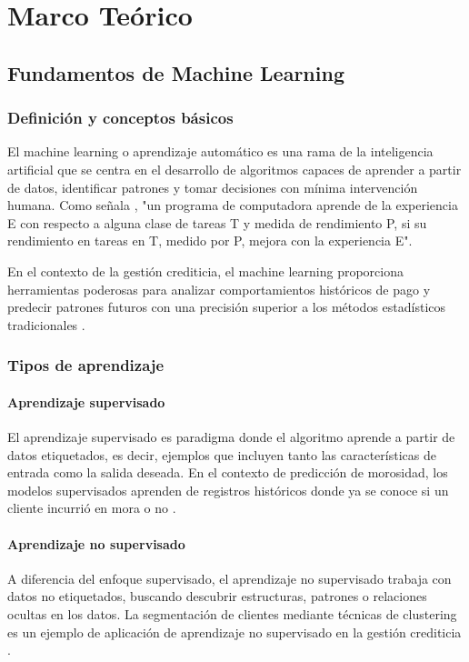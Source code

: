 \chapter{Marco Teórico}

\section{Fundamentos de Machine Learning}
\subsection{Definición y conceptos básicos}
El machine learning o aprendizaje automático es una rama de la inteligencia artificial que se centra en el desarrollo de algoritmos capaces de aprender a partir de datos, identificar patrones y tomar decisiones con mínima intervención humana. Como señala \cite{mitchell1997machine}, "un programa de computadora aprende de la experiencia E con respecto a alguna clase de tareas T y medida de rendimiento P, si su rendimiento en tareas en T, medido por P, mejora con la experiencia E".

En el contexto de la gestión crediticia, el machine learning proporciona herramientas poderosas para analizar comportamientos históricos de pago y predecir patrones futuros con una precisión superior a los métodos estadísticos tradicionales \cite{garcia2024machine}.

\subsection{Tipos de aprendizaje}
\subsubsection{Aprendizaje supervisado}
El aprendizaje supervisado es paradigma donde el algoritmo aprende a partir de datos etiquetados, es decir, ejemplos que incluyen tanto las características de entrada como la salida deseada. En el contexto de predicción de morosidad, los modelos supervisados aprenden de registros históricos donde ya se conoce si un cliente incurrió en mora o no \cite{torres2023inteligencia}.

\subsubsection{Aprendizaje no supervisado}
A diferencia del enfoque supervisado, el aprendizaje no supervisado trabaja con datos no etiquetados, buscando descubrir estructuras, patrones o relaciones ocultas en los datos. La segmentación de clientes mediante técnicas de clustering es un ejemplo de aplicación de aprendizaje no supervisado en la gestión crediticia \cite{ramirez2023predictive}.


